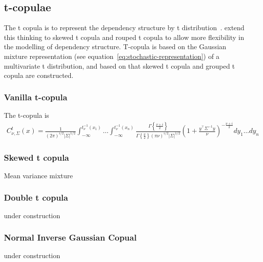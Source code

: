 \subsection{t-copulae}\label{subsec:t-copulae}
The t copula is to represent the dependency structure by t distribution~\citep{fang2002meta, embrechts2002correlation}.
\cite{demarta2005t} extend this thinking to skewed t copula and rouped t copula to allow more flexibility in the modelling of dependency structure.
T-copula is based on the Gaussian mixture representation (see equation~\ref{eq:stochastic-representation}) of a multivariate t distribution,
and based on that skewed t copula and grouped t copula are constructed.

\subsubsection{Vanilla t-copula}\label{subsec:vanilla-t-copula}
The t-copula is
\begin{align}
    C^t_{\nu, \Sigma}(x) = \frac{1}{(2\pi)^{i/2} |\Sigma|^{1/2}}
    \int_{-\infty}^{t_\nu^{-1}(x_1)} \dots \int_{-\infty}^{t_\nu^{-1}(x_n)}
    \frac{\Gamma\left\{ \frac{\nu + i}{2}\right\}}{\Gamma \left\{\frac{\nu}{2}\right\} (\pi \nu)^{i/2}|\Sigma|^{1/2}}
    \left(
    1+ \frac{y^\top \Sigma^{-1}y}{\nu}
    \right)^{-\frac{\nu + i}{2}}
    dy_1 \dots dy_n
    \end{align}

\subsubsection{Skewed t copula}\label{subsec:skewed-t-copula}
Mean variance mixture

\subsubsection{Double t copula}
under construction

\subsubsection{Normal Inverse Gaussian Copual}
under construction






